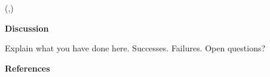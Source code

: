 \documentclass[dark]{cgem-poster}
\begin{document}
  \begin{textblock*}{\PosterColumnThreeTextWidth{}}(\PosterColumnThreeTextLeft{},\PosterColumnThreeTextTop{})
    \begin{minipage}[t][\PosterColumnThreeTextHeight{}][t]{\PosterColumnThreeTextWidth{}}
      \vspace{5mm}
      \begin{center}
        \large
        \textbf{Discussion}
      \end{center}

      \vspace{5mm}
      \small
      Explain what you have done here. %
      Successes. Failures. Open questions?

      \vspace{50cm}
      \PosterColumnHorizontalBar{}
      \begin{center}
        \large
        \textbf{References}
      \end{center}

      \renewcommand*{\bibfont}{\small}
      \printbibliography
    
    \end{minipage}
  \end{textblock*}
\end{document}
